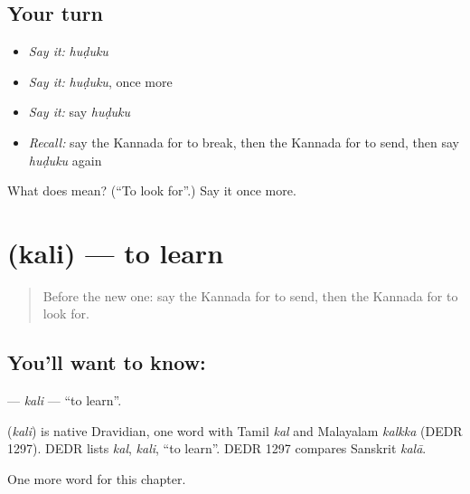 \subsection*{Your turn}
\begin{itemize}
\raggedright
  \item \emph{Say it:} \emph{huḍuku}
  \item \emph{Say it:} \emph{huḍuku}, once more
  \item \emph{Say it:} say \emph{huḍuku}
  \item \emph{Recall:} say the Kannada for to break, then the Kannada for to send, then say \emph{huḍuku} again
\end{itemize}

\begin{tcolorbox}[breakable,colback=teal!4,colframe=teal!35!black,title={Before you move on}]
What does  mean? (\textquotedblleft{}To look for\textquotedblright{}.) Say it once more.
\end{tcolorbox}
\section[\texorpdfstring{\kn{ಕಲಿ} (kali)}{ಕಲಿ (kali)}]{ (kali) — to learn}

\label{lesson:KA-C148-kali}



\begin{quote}
Before the new one: say the Kannada for to send, then the Kannada for to look for.
\end{quote}

\subsection*{You'll want to know: }
\textbf{} — \emph{kali} — \textquotedblleft{}to learn\textquotedblright{}.

\begin{cousinweb}
\textbf{} (\emph{kali}) is native Dravidian, one word with Tamil \emph{kal} and Malayalam \emph{kalkka} (DEDR 1297). DEDR lists \emph{kal}, \emph{kali}, \textquotedblleft{}to learn\textquotedblright{}. DEDR 1297 compares Sanskrit \emph{kalā}.
\end{cousinweb}

\begin{grammarlens}[title={What you've built}]
One more word for this chapter.
\end{grammarlens}

